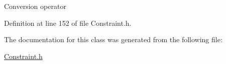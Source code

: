 Conversion operator 

Definition at line 152 of file Constraint.\+h.



The documentation for this class was generated from the following file\+:\begin{DoxyCompactItemize}
\item 
\hyperlink{Constraint_8h}{Constraint.\+h}\end{DoxyCompactItemize}

